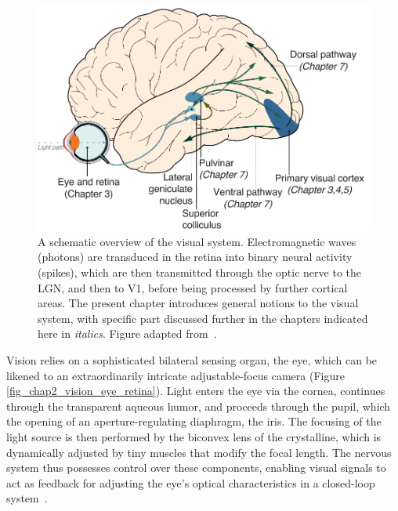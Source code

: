 \begin{figure}[h!tbp]
\vspace{0.5cm}
\centering
\includegraphics[width=.9\textwidth]{fig/chap2_fig_visual_system.pdf}
\caption[A schematic overview of the visual system.]{A schematic overview of the visual system. Electromagnetic waves (photons) are transduced in the retina into binary neural activity (spikes), which are then transmitted through the optic nerve to the \gls{LGN}, and then to \gls{V1}, before being processed by further cortical areas. The present chapter introduces general notions to the visual system, with specific part discussed further in the chapters indicated here in \textit{italics}. Figure adapted from~\cite{kandel2000principles}.}
\label{fig_chap2_vision_overview}
\end{figure}

Vision relies on a sophisticated bilateral sensing organ, the eye, which can be likened to an extraordinarily intricate adjustable-focus camera (Figure \ref{fig_chap2_vision_eye_retina}). Light enters the eye via the cornea, continues through the transparent aqueous humor, and proceeds through the pupil, which the opening of an aperture-regulating diaphragm, the iris. The focusing of the light source is then performed by the biconvex lens of the crystalline, which is dynamically adjusted by tiny muscles that modify the focal length. The nervous system thus possesses control over these components, enabling visual signals to act as feedback for adjusting the eye's optical characteristics in a closed-loop system~\cite{fernandez2001closed}.

